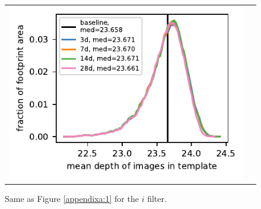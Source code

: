 \documentclass[preprintm,linenumbers]{aastex631}
\begin{document}
\begin{figure}[h]
\begin{tabular}{@{}c@{}c@{}}
					\includegraphics{results/histograms_templates_tscale/hist_first_year_one_snap_v4_0_10yrs_db_noDD_noTwi_doALLTemplateMetrics_reduceDepthTemplate_i_noDD_noTwi.pdf} \\
					
				\end{tabular}
			\caption{
				Same as Figure \ref{appendixa:1} for the $i$ filter.  \label{appendixa:4}
			}
		\end{figure}
\end{document}
